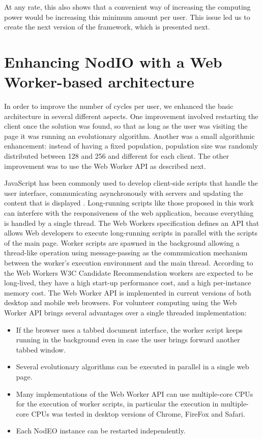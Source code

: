 \documentclass[journal,onecolumn]{IEEEtran}
\begin{document}
At any rate, this also shows that a convenient way of increasing the
computing power would be increasing this minimum amount per user. This
issue led us to create the next version of the framework, which is
presented next. %

\section{Enhancing NodIO with a Web Worker-based architecture}
\label{sec:w2}

In order to improve the number of cycles per user, we enhanced the
basic architecture in several different aspects.  One improvement 
involved restarting the client once the solution was
found, so that as long as the user was visiting the page it was
running an evolutionary algorithm. Another was a small algorithmic
enhancement: instead of having a fixed population,
population size was randomly distributed between 128 and 256 and
different for each client.  The other improvement was to 
use the Web Worker API as described next.

JavaScript has been commonly used to develop client-side scripts
that handle the user interface, communicating asynchronously with servers and
updating the content that is displayed \cite{flanagan2006javascript}.
Long-running scripts like those proposed in this work can interfere with the
responsiveness of the web application, because everything is handled by a
single thread. The Web Workers specification \cite{hickson2012web} defines an
API that allows Web developers to execute long-running scripts in parallel
with the scripts of the main page. Worker scripts are spawned in the
background allowing a thread-like operation using message-passing as the
communication mechanism between the worker's execution environment and the
main thread. According to the Web Workers W3C Candidate Recommendation
\cite{hickson2012web} workers are expected to be long-lived, they have a high
start-up performance cost, and a high per-instance memory cost. The Web Worker
API is implemented in current versions of both desktop and mobile web browsers.
For volunteer computing using the Web Worker API brings several advantages
over a single threaded implementation:

\begin{itemize}
\item If the browser uses a tabbed document interface, the worker script
keeps running in the background even in case the user brings forward another tabbed
window.
\item Several evolutionary algorithms can be executed in parallel in a single web
page. 
\item Many implementations of the Web Worker API can use multiple-core CPUs for
the execution of worker scripts, in particular the execution in multiple-core CPUs
was tested in desktop versions of Chrome, FireFox and Safari.
\item Each {\sf NodEO} instance can be restarted independently.
\end{itemize}
\end{document}
